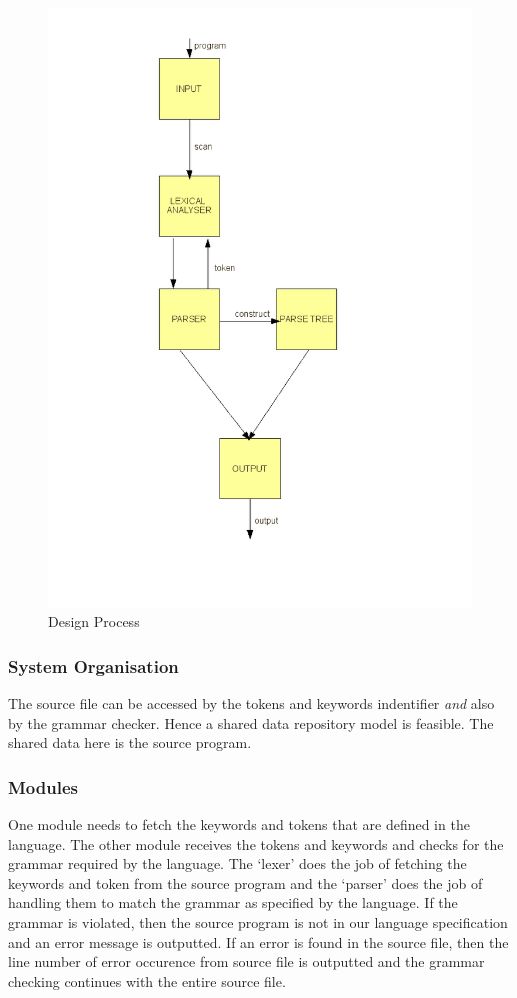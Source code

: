 \documentclass[12pt, oneside, a4paper]{article}
\begin{document}
\begin{figure}[htb]
\begin{center}
\ifpdf
	\includegraphics[scale=0.40]{design.png}
\else
\fi
\caption{Design Process}
\end{center}
\end{figure}

\subsubsection{System Organisation}
The source file can be accessed by the tokens and keywords indentifier \emph{and} also by the grammar checker.  Hence a shared data repository model is feasible.  The shared data here is the source program.

\subsubsection{Modules}
One module needs to fetch the keywords and tokens that are defined in the language.  The other module receives the tokens and keywords and checks for the grammar required by the language.  The `lexer' does the job of fetching the keywords and token from the source program and the `parser' does the job of handling them to match the grammar as specified by the language.  If the grammar is violated, then the source program is not in our language specification and an error message is outputted.  If an error is found in the source file, then the line number of error occurence from source file is outputted and the grammar checking continues with the entire source file.
\end{document}
